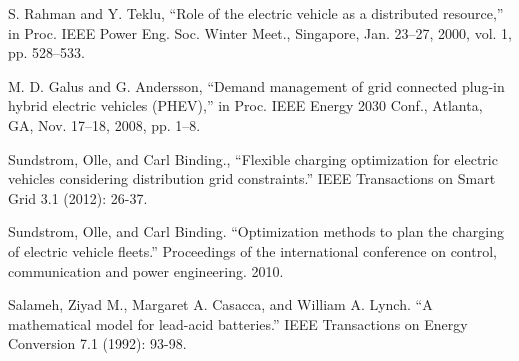 S. Rahman and Y. Teklu, ``Role of the electric vehicle as a distributed
resource,” in Proc. IEEE Power Eng. Soc. Winter Meet., Singapore,
Jan. 23–27, 2000, vol. 1, pp. 528–533.

 M. D. Galus and G. Andersson, ``Demand management of grid connected
plug-in hybrid electric vehicles (PHEV),” in Proc. IEEE Energy
2030 Conf., Atlanta, GA, Nov. 17–18, 2008, pp. 1–8.

Sundstrom, Olle, and Carl Binding., ``Flexible charging optimization for electric vehicles considering distribution grid constraints.'' IEEE Transactions on Smart Grid 3.1 (2012): 26-37.

Sundstrom, Olle, and Carl Binding. ``Optimization methods to plan the charging of electric vehicle fleets.'' Proceedings of the international conference on control, communication and power engineering. 2010.

Salameh, Ziyad M., Margaret A. Casacca, and William A. Lynch. ``A mathematical model for lead-acid batteries.'' IEEE Transactions on Energy Conversion 7.1 (1992): 93-98.

